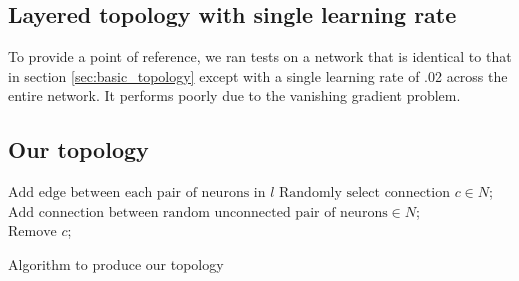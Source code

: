 \documentclass[format=sigconf]{acmart}
\begin{document}
\subsection{Layered topology with single learning rate}
\label{sec:basic_topology_uniform}

To provide a point of reference, we ran tests on a network that is identical to that in section \ref{sec:basic_topology} except with a single learning rate of .02 across the entire network. It performs poorly due to the vanishing gradient problem.

\subsection{Our topology}
\label{sec:our_topology}


\begin{algorithm}
{
	$\text{Add edge between each pair of neurons in }l$
}
{
	$\text{Randomly select connection }c\in N$;\\
	$\text{Add connection between random unconnected pair of neurons}\in N$;\\
	$\text{Remove }c$;
}

\caption{Algorithm to produce our topology}
\label{alg:ourtop}
\end{algorithm}
\end{document}
